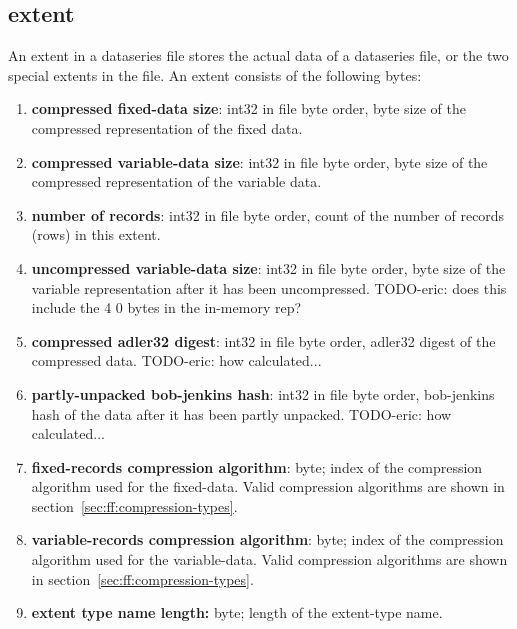 \subsection{extent}

An extent in a dataseries file stores the actual data of a dataseries
file, or the two special extents in the file.  An extent consists of
the following bytes:

\begin{enumerate}

  \item {\bf compressed fixed-data size}: int32 in file byte order,
    byte size of the compressed representation of the fixed data.

  \item {\bf compressed variable-data size}: int32 in file byte order,
    byte size of the compressed representation of the variable data.

  \item {\bf number of records}: int32 in file byte order, count of
    the number of records (rows) in this extent.

  \item {\bf uncompressed variable-data size}: int32 in file byte order, 
    byte size of the variable representation after it has been uncompressed.
   TODO-eric: does this include the 4 0 bytes in the in-memory rep?

  \item {\bf compressed adler32 digest}: int32 in file byte order, 
    adler32 digest of the compressed data.
    TODO-eric: how calculated...

  \item {\bf partly-unpacked bob-jenkins hash}: int32 in file byte order,
    bob-jenkins hash of the data after it has been partly unpacked.
    TODO-eric: how calculated...

  \item {\bf fixed-records compression algorithm}: byte; index of the
    compression algorithm used for the fixed-data.  Valid compression algorithms
    are shown in section~\ref{sec:ff:compression-types}.

  \item {\bf variable-records compression algorithm}: byte; index of the
    compression algorithm used for the variable-data.  Valid compression algorithms
    are shown in section~\ref{sec:ff:compression-types}.

  \item {\bf extent type name length:} byte; length of the extent-type
    name.


\end{enumerate}
